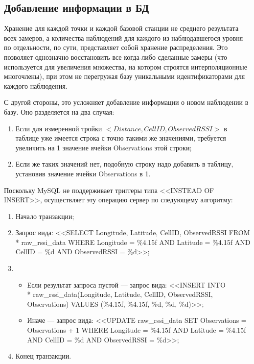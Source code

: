 \subsection{Добавление информации в БД}
Хранение для каждой точки и каждой базовой станции не среднего результата всех замеров, а количества наблюдений для каждого из наблюдавшегося уровня по отдельности, по сути, представляет собой хранение распределения. Это позволяет однозначно восстановить все когда-либо сделанные замеры (что используется для увеличения множества, на котором строятся интерполяционные многочлены), при этом не перегружая базу уникальными идентификаторами для каждого наблюдения.

С другой стороны, это усложняет добавление информации о новом наблюдении в базу. Оно разделяется на два случая:
\begin{enumerate}
	\item
		Если для измеренной тройки $<Distance, CellID, ObservedRSSI>$ в таблице уже имеется строка с точно такими же значениями, требуется увеличить на 1 значение ячейки Observations этой строки;
	\item
		Если же таких значений нет, подобную строку надо добавить в таблицу, установив значение ячейки Observations в 1.
\end{enumerate}

Поскольку MySQL не поддерживает триггеры типа <<INSTEAD OF INSERT>>\cite{triggersyntax}, осуществляет эту операцию сервер по следующему алгоритму:
\begin{enumerate}
	\item
		Начало транзакции;
	\item
		Запрос вида: <<SELECT Longitude, Latitude, CellID, ObservedRSSI FROM\\* raw\_rssi\_data WHERE Longitude = \%4.15f AND Latitude = \%4.15f AND CellID = \%d AND ObservedRSSI = \%d>>;
	\item
		\begin{itemize}
			\item
				Если результат запроса пустой --- запрос вида: <<INSERT INTO\\* raw\_rssi\_data(Longitude, Latitude, CellID, ObservedRSSI, Observations) VALUES (\%4.15f, \%4.15f, \%d, \%d, \%d)>>;
			\item
				Иначе --- запрос вида: <<UPDATE raw\_rssi\_data SET Observations = Observations + 1 WHERE Longitude = \%4.15f AND Latitude = \%4.15f AND CellID = \%d AND ObservedRSSI = \%d>>;
		\end{itemize}
	\item
		Конец транзакции.
\end{enumerate}

